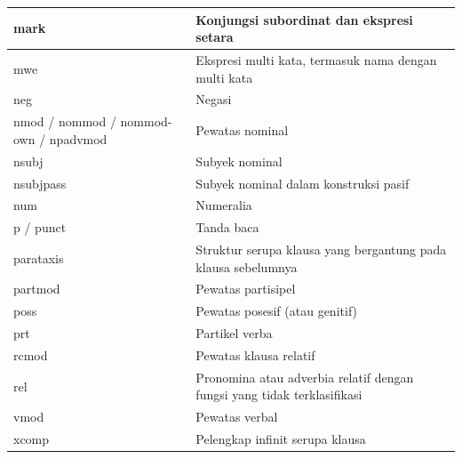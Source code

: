 \begin{center}
\begin{small}
\begin{longtable}{| p{} | p{} |}
mark & Konjungsi subordinat dan ekspresi setara \\ \hline
mwe & Ekspresi multi kata, termasuk nama dengan multi kata \\ \hline
neg & Negasi \\ \hline
nmod / nommod / nommod-own / npadvmod & Pewatas nominal \\ \hline
nsubj & Subyek nominal \\ \hline
nsubjpass & Subyek nominal dalam konstruksi pasif \\ \hline
num & Numeralia \\ \hline
p / punct & Tanda baca \\ \hline
parataxis & Struktur serupa klausa yang bergantung pada klausa sebelumnya \\ \hline
partmod & Pewatas partisipel \\ \hline
poss & Pewatas posesif (atau genitif) \\ \hline
prt & Partikel verba \\ \hline
rcmod & Pewatas klausa relatif \\ \hline
rel & Pronomina atau adverbia relatif dengan fungsi yang tidak terklasifikasi \\ \hline
vmod & Pewatas verbal \\ \hline
xcomp & Pelengkap infinit serupa klausa \\ \hline
    \hline
  \end{longtable}
\end{small}
\end{center}


